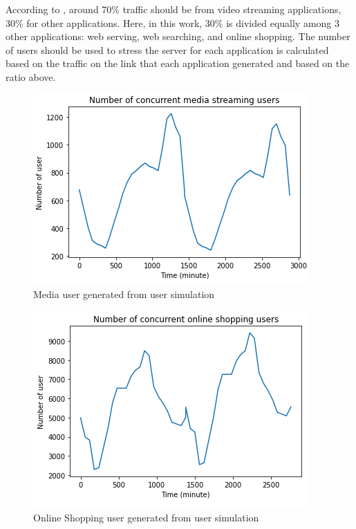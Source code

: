 \documentclass[conference]{IEEEtran}
\begin{document}
According to \cite{5GPPP2020}, around 70\% traffic should be from video streaming applications, 30\% for other applications. Here, in this work, 30\% is divided equally among 3 other applications: web serving, web searching, and online shopping. The number of users should be used to stress the server for each application is calculated based on the traffic on the link that each application generated and based on the ratio above.

\begin{figure}[]
    \centering
        \includegraphics[scale = 0.8]{imgs/media_streaming_concurrent_user_2days.png}
        \caption{Media user generated from user simulation}
        \label{fig:media_user}
    \end{figure}

\begin{figure}[]
    \centering
        \includegraphics[scale = 0.8]{imgs/online_shopping_concurrent_users_2days.png}
        \caption{Online Shopping user generated from user simulation}
        \label{fig:shopping_user}
    \end{figure}
\end{document}
